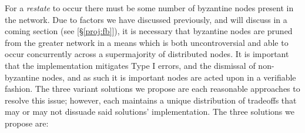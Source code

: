 For a \textit{restate} to occur there must be some number of byzantine nodes present in the network. Due to factors we have discussed previously, and will discuss in a coming section (see \textit{} [\S\ref{proj:fb}]), it is necessary that byzantine nodes are pruned from the greater network in a means which is both uncontroversial and able to occur concurrently across a supermajority of distributed nodes. It is important that the implementation mitigates Type I errors, and the dismissal of non-byzantine nodes, and as such it is important nodes are acted upon in a verifiable fashion. The three variant solutions we propose are each reasonable approaches to resolve this issue; however, each maintains a unique distribution of tradeoffs that may or may not dissuade said solutions' implementation. The three solutions we propose are: 

